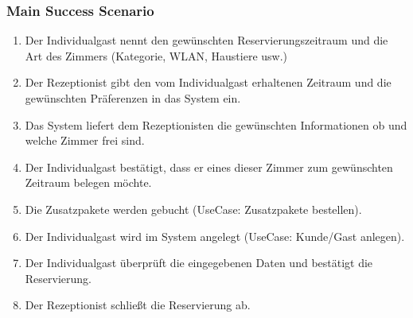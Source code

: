 \documentclass[./detailed_overview_usecases.tex]{subfiles}
\begin{document}
    \subsubsection*{Main Success Scenario}
    \begin{enumerate}
        \item Der Individualgast nennt den gewünschten Reservierungszeitraum und die Art des Zimmers (Kategorie, WLAN, Haustiere usw.)
        \item Der Rezeptionist gibt den vom Individualgast erhaltenen Zeitraum und die gewünschten Präferenzen in das System ein.
        \item Das System liefert dem Rezeptionisten die gewünschten Informationen ob und welche Zimmer frei sind.
        \item Der Individualgast bestätigt, dass er eines dieser Zimmer zum gewünschten Zeitraum belegen möchte.
        \item Die Zusatzpakete werden gebucht (UseCase: Zusatzpakete bestellen).
        \item Der Individualgast wird im System angelegt (UseCase: Kunde/Gast anlegen).
        \item Der Individualgast überprüft die eingegebenen Daten und bestätigt die Reservierung.
        \item Der Rezeptionist schließt die Reservierung ab.
    \end{enumerate}
\end{document}
